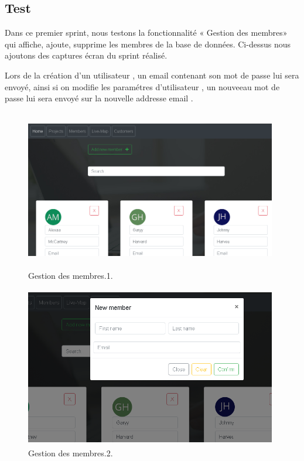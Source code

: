 \subsection{Test}

Dans ce premier sprint, nous testons la fonctionnalit\'{e}
« Gestion des membres» qui affiche, ajoute,
supprime les membres de la base de donn\'{e}es.
Ci-dessus nous ajoutons des captures \'{e}cran du sprint r\'{e}alis\'{e}.

\bigskip
\bigskip

Lors de la cr\'{e}ation d'un utilisateur , un email contenant son mot de passe lui
sera envoy\'{e}, ainsi si on modifie les param\'{e}tres d'utilisateur , un nouveeau
mot de passe lui sera envoy\'{e} sur la nouvelle addresse email .

\bigskip
\bigskip

\begin{figure}[H]
\center
\includegraphics[width=11cm,height=7cm]{./figures/pres/mm1.png}
\caption{Gestion des membres.1.}
\end{figure}

\begin{figure}[H]
\center
\includegraphics[width=11cm,height=7cm]{./figures/pres/mm2.png}
\caption{Gestion des membres.2.}
\end{figure}




